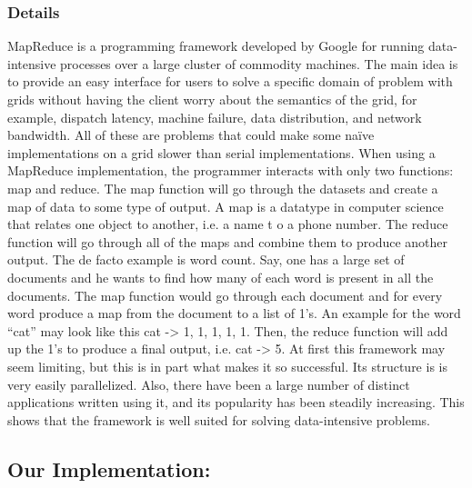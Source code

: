 \documentclass{rspublic}
\begin{document}


\subsubsection{Details}

MapReduce is a programming framework developed by Google for running
data-intensive processes over a large cluster of commodity machines.
The main idea is to provide an easy interface for users to solve a
specific domain of problem with grids without having the client worry 
about the semantics of the grid, for example, dispatch latency, machine
failure, data distribution, and network bandwidth.  All of these are
problems that could make some naïve implementations on a grid slower
than serial implementations.  When using a MapReduce implementation,
the programmer interacts with only two functions: map and reduce.  
The map function will go through the datasets and create a map of data
to some type of output.  A map is a datatype in computer science that
relates one object to another, i.e. a name t o a phone number.  The reduce
function will go through all of the maps and combine them to produce
another output.  The de facto example is word count.  Say, one has a
large set of documents and he wants to find how many of each word is
present in all the documents.  The map function would go through each
document and for every word produce a map from the document to a list
of 1’s.  An example for the word “cat” may look like this cat -> 1, 1,
1, 1, 1.  Then, the reduce function will add up the 1’s to produce a
final output, i.e. cat -> 5.  At first this framework may seem limiting,
but this is in part what makes it so successful.  Its structure is 
is very easily parallelized.   Also, there have been a large number
of distinct applications written using it, and its popularity has been
steadily increasing.  This shows that the framework is well suited for
solving data-intensive problems.


\subsection{Our Implementation:} 
\end{document}
